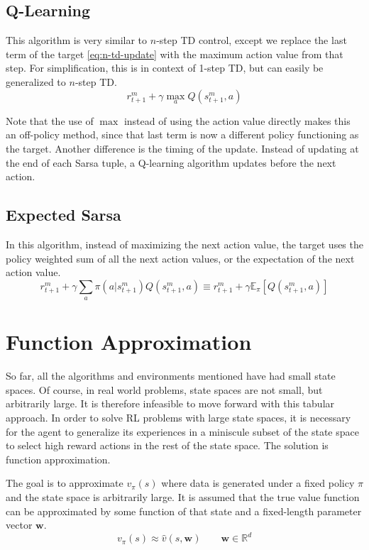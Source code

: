 \documentclass{article}
\begin{document}
\subsection{Q-Learning}
This algorithm is very similar to $n$-step TD control, except we replace the last term of the target \eqref{eq:n-td-update} with the maximum action value 
from that step. For simplification, this is in context of 1-step TD, but can easily be generalized to $n$-step TD.
\begin{equation}
  r_{t+1}^m + \gamma \max_a Q(s_{t+1}^m, a)
\end{equation}

Note that the use of $\max$ instead of using the action value directly makes this an off-policy method, since that last term is 
now a different policy functioning as the target. Another difference is the timing of the update. Instead of updating at the end of
each Sarsa tuple, a Q-learning algorithm updates before the next action.

\subsection{Expected Sarsa}
In this algorithm, instead of maximizing the next action value, the target uses the policy weighted sum of all the next action values, or 
the expectation of the next action value.
\begin{equation}
  r_{t+1}^m + \gamma \sum_a \pi(a|s_{t+1}^m) Q(s_{t+1}^m, a) \equiv r_{t+1}^m + \gamma \mathbb{E}_\pi[Q(s_{t+1}^m, a)]
\end{equation}



\section{Function Approximation}
So far, all the algorithms and environments mentioned have had small state spaces. Of course, in real world problems, state spaces are not small,
but arbitrarily large. It is therefore infeasible to move forward with this tabular approach. In order to solve RL problems with large state spaces,
it is necessary for the agent to generalize its experiences in a miniscule subset of the state space to select high reward actions in the rest of 
the state space. The solution is function approximation.

The goal is to approximate $v_\pi(s)$ where data is generated under a fixed policy $\pi$ and the state space is arbitrarily large. It is assumed 
that the true value function can be approximated by some function of that state and a fixed-length parameter vector $\mathbf{w}$.
\begin{equation}
  v_\pi(s) \approx \hat{v}(s, \mathbf{w}) \qquad \mathbf{w} \in \mathbb{R}^d
\end{equation}
\end{document}
